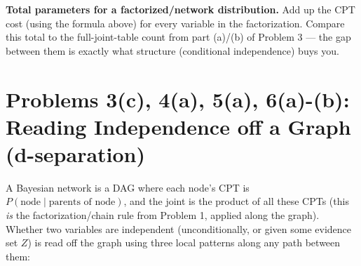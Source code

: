 \documentclass[11pt]{article}
\begin{document}
\textbf{Total parameters for a factorized/network distribution.} Add up
the CPT cost (using the formula above) for every variable in the
factorization. Compare this total to the full-joint-table count from
part (a)/(b) of Problem 3 --- the gap between them is exactly what
structure (conditional independence) buys you.

\section*{Problems 3(c), 4(a), 5(a), 6(a)-(b): Reading Independence off a Graph (d-separation)}

A Bayesian network is a DAG where each node's CPT is
$P(\text{node} \mid \text{parents of node})$, and the joint is the
product of all these CPTs (this \emph{is} the factorization/chain rule
from Problem 1, applied along the graph). Whether two variables are
independent (unconditionally, or given some evidence set $Z$) is read
off the graph using three local patterns along any path between them:

\begin{center}
\end{center}
\end{document}
